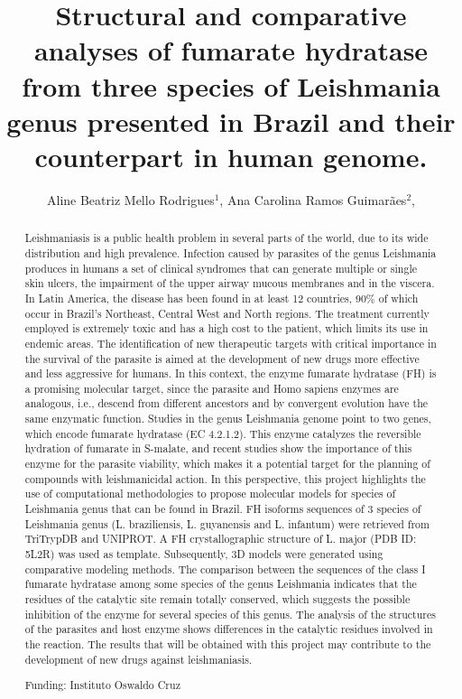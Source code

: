 \documentclass[twoside]{article}
\title{\vspace{-15mm}\fontsize{24pt}{10pt}\selectfont\textbf{ Structural and comparative analyses of fumarate hydratase from three species of Leishmania genus presented in Brazil and their counterpart in human genome. }} %
\author{ Aline Beatriz Mello Rodrigues$^{1}$, Ana Carolina Ramos Guimarães$^{2}$, }
\affil{ 1 Instituto Oswaldo Cruz

2 FIOCRUZ-IOC

 }
\date{}
\begin{document}
  
  
  \maketitle %
  
  
  \thispagestyle{fancy} %
  
  
  \begin{abstract}
  Leishmaniasis is a public health problem in several parts of the world, due to its wide distribution and high prevalence. Infection caused by parasites of the genus Leishmania produces in humans a set of clinical syndromes that can generate multiple or single skin ulcers, the impairment of the upper airway mucous membranes and in the viscera. In Latin America, the disease has been found in at least 12 countries, 90\% of which occur in Brazil’s Northeast, Central West and North regions. The treatment currently employed is extremely toxic and has a high cost to the patient, which limits its use in endemic areas. The identification of new therapeutic targets with critical importance in the survival of the parasite is aimed at the development of new drugs more effective and less aggressive for humans. In this context, the enzyme fumarate hydratase (FH) is a promising molecular target, since the parasite and Homo sapiens enzymes are analogous, i.e., descend from different ancestors and by convergent evolution have the same enzymatic function. Studies in the genus Leishmania genome point to two genes, which encode fumarate hydratase (EC 4.2.1.2). This enzyme catalyzes the reversible hydration of fumarate in S-malate, and recent studies show the importance of this enzyme for the parasite viability, which makes it a potential target for the planning of compounds with leishmanicidal action. In this perspective, this project highlights the use of computational methodologies to propose molecular models for species of Leishmania genus that can be found in Brazil. FH isoforms sequences of 3 species of Leishmania genus (L. braziliensis, L. guyanensis and L. infantum) were retrieved from TriTrypDB and UNIPROT. A FH crystallographic structure of L. major (PDB ID: 5L2R) was used as template. Subsequently, 3D models were generated using comparative modeling methods. The comparison between the sequences of the class I fumarate hydratase among some species of the genus Leishmania indicates that the residues of the catalytic site remain totally conserved, which suggests the possible inhibition of the enzyme for several species of this genus. The analysis of the structures of the parasites and host enzyme shows differences in the catalytic residues involved in the reaction. The results that will be obtained with this project may contribute to the development of new drugs against leishmaniasis.
  
  Funding: Instituto Oswaldo Cruz \\ 
  \end{abstract}
  
\end{document}
